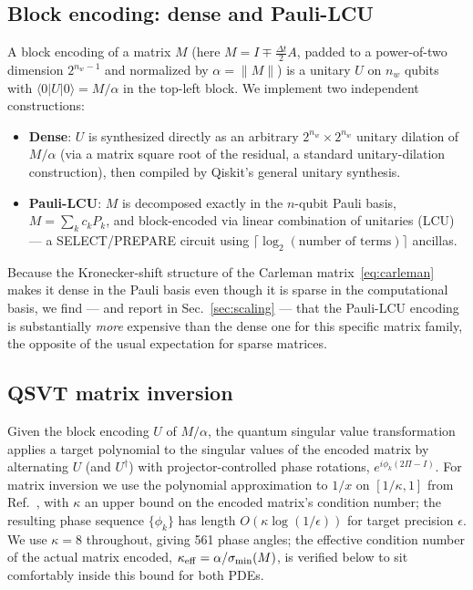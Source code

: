 \documentclass[aps,pra,twocolumn,notitlepage,superscriptaddress,floatfix,10pt]{revtex4-2}
\renewcommand{\ket}[1]{\lvert #1 \rangle}
\renewcommand{\bra}[1]{\langle #1 \rvert}
\newcommand{\norm}[1]{\lVert #1 \rVert}
\begin{document}
\subsection{Block encoding: dense and Pauli-LCU}
A block encoding of a matrix $M$ (here $M=I\mp\tfrac{\Delta t}{2}A$, padded to a power-of-two
dimension $2^{n_w-1}$ and normalized by $\alpha=\norm{M}$) is a unitary $U$ on $n_w$ qubits with
$\bra{0}U\ket{0}=M/\alpha$ in the top-left block. We implement two independent constructions:
\begin{itemize}
\item \textbf{Dense}: $U$ is synthesized directly as an arbitrary $2^{n_w}\times2^{n_w}$ unitary
dilation of $M/\alpha$ (via a matrix square root of the residual, a standard unitary-dilation
construction), then compiled by Qiskit's general unitary synthesis.
\item \textbf{Pauli-LCU}: $M$ is decomposed exactly in the $n$-qubit Pauli basis,
$M=\sum_k c_k P_k$, and block-encoded via linear combination of unitaries (LCU) --- a SELECT/PREPARE
circuit using $\lceil\log_2(\text{number of terms})\rceil$ ancillas.
\end{itemize}
Because the Kronecker-shift structure of the Carleman matrix~\eqref{eq:carleman} makes it dense in
the Pauli basis even though it is sparse in the computational basis, we find --- and report in
Sec.~\ref{sec:scaling} --- that the Pauli-LCU encoding is substantially \emph{more} expensive than the
dense one for this specific matrix family, the opposite of the usual expectation for sparse matrices.

\subsection{QSVT matrix inversion}
Given the block encoding $U$ of $M/\alpha$, the quantum singular value transformation
\cite{Gilyen2019} applies a target polynomial to the singular values of the encoded matrix by
alternating $U$ (and $U^\dagger$) with projector-controlled phase rotations,
$e^{i\phi_k(2\Pi-I)}$. For matrix inversion we use the polynomial approximation to $1/x$ on
$[1/\kappa,1]$ from Ref.~\cite{Gilyen2019}, with $\kappa$ an upper bound on the encoded matrix's condition
number; the resulting phase sequence $\{\phi_k\}$ has length $O(\kappa\log(1/\epsilon))$ for target
precision $\epsilon$. We use $\kappa=8$ throughout, giving 561 phase angles; the effective condition
number of the actual matrix encoded, $\kappa_{\rm eff}=\alpha/\sigma_{\min}(M)$, is verified below to
sit comfortably inside this bound for both PDEs.
\end{document}
